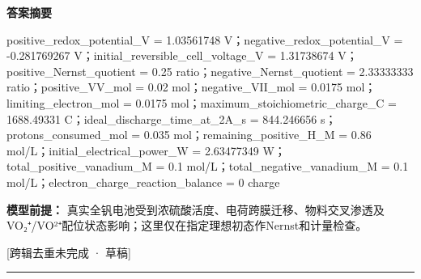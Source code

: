 \documentclass[UTF8,11pt,a4paper]{ctexart}
\begin{document}
\noindent\textbf{答案摘要}\par
positive\_redox\_potential\_V = 1.03561748 V；negative\_redox\_potential\_V = -0.281769267 V；initial\_reversible\_cell\_voltage\_V = 1.31738674 V；positive\_Nernst\_quotient = 0.25 ratio；negative\_Nernst\_quotient = 2.33333333 ratio；positive\_VV\_mol = 0.02 mol；negative\_VII\_mol = 0.0175 mol；limiting\_electron\_mol = 0.0175 mol；maximum\_stoichiometric\_charge\_C = 1688.49331 C；ideal\_discharge\_time\_at\_2A\_s = 844.246656 s；protons\_consumed\_mol = 0.035 mol；remaining\_positive\_H\_M = 0.86 mol/L；initial\_electrical\_power\_W = 2.63477349 W；total\_positive\_vanadium\_M = 0.1 mol/L；total\_negative\_vanadium\_M = 0.1 mol/L；electron\_charge\_reaction\_balance = 0 charge\par
\noindent\textbf{模型前提：}
真实全钒电池受到浓硫酸活度、电荷跨膜迁移、物料交叉渗透及VO₂⁺/VO²⁺配位状态影响；这里仅在指定理想初态作Nernst和计量检查。\par
\noindent\textcolor{red!65!black}{[跨辑去重未完成 · 草稿]} \par
\medskip\hrule\medskip
{}
\end{document}
